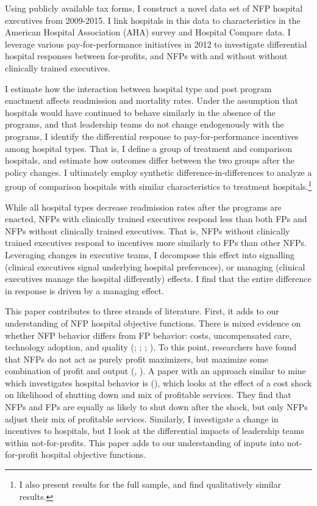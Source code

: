 \documentclass[12pt]{article}
\begin{document}
  Using publicly available tax forms, I construct a novel data set of NFP hospital executives from 2009-2015. I link hospitals in this data to characteristics in the American Hospital Association (AHA) survey and Hospital Compare data. I leverage various pay-for-performance initiatives in 2012 to investigate differential hospital responses between for-profits, and NFPs with and without without clinically trained executives. 
  
  I estimate how the interaction between hospital type and post program enactment affects readmission and mortality rates. Under the assumption that hospitals would have continued to behave similarly in the absence of the programs, and that leadership teams do not change endogenously with the programs, I identify the differential response to pay-for-performance incentives among hospital types. That is, I define a group of treatment and comparison hospitals, and estimate how outcomes differ between the two groups after the policy changes. I ultimately employ synthetic difference-in-differences to analyze a group of comparison hospitals with similar characteristics to treatment hospitals.\footnote{I also present results for the full sample, and find qualitatively similar results.} 
  
   While all hospital types decrease readmission rates after the programs are enacted, NFPs with clinically trained executives respond less than both FPs and NFPs without clinically trained executives. That is, NFPs without clinically trained executives respond to incentives more similarly to FPs than other NFPs. Leveraging changes in executive teams, I decompose this effect into signalling (clinical executives signal underlying hospital preferences), or managing (clinical executives manage the hospital differently) effects. I find that the entire difference in response is driven by a managing effect. 

    This paper contributes to three strands of literature. First, it adds to our understanding of NFP hospital objective functions. There is mixed evidence on whether NFP behavior differs from FP behavior: costs, uncompensated care, technology adoption, and quality (\cite{sloan2000not}; \cite{eggleston2008hospital}; \cite{moscelli2018effect}; \cite{moscone2020public}). To this point, researchers have found that NFPs do not act as purely profit maximizers, but maximize some combination of profit and output (\cite{deneffe2002not}, \cite{chang2011nonprofit}). A paper with an approach similar to mine which investigates hospital behavior is \citeauthor{chang2011nonprofit} (\citeyear{chang2011nonprofit}), which looks at the effect of a cost shock on likelihood of shutting down and mix of profitable services. They find that NFPs and FPs are equally as likely to shut down after the shock, but only NFPs adjust their mix of profitable services. Similarly, I investigate a change in incentives to hospitals, but I look at the differential impacts of leadership teams within not-for-profits. This paper adds to our understanding of inputs into not-for-profit hospital objective functions. 
\end{document}
